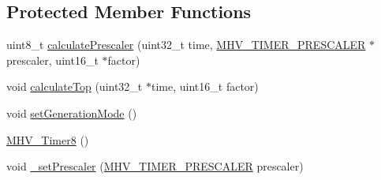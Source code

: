 \subsection*{\-Protected \-Member \-Functions}
\begin{DoxyCompactItemize}
\item 
uint8\-\_\-t \hyperlink{class_m_h_v___timer8_a044d91ee04cc07dad098be8010f94463}{calculate\-Prescaler} (uint32\-\_\-t time, \hyperlink{_m_h_v___timer8_8h_a2e7ef9dbc200586bf55b0003896de599}{\-M\-H\-V\-\_\-\-T\-I\-M\-E\-R\-\_\-\-P\-R\-E\-S\-C\-A\-L\-E\-R} $\ast$prescaler, uint16\-\_\-t $\ast$factor)
\item 
void \hyperlink{class_m_h_v___timer8_a8f1a062c5b11ccc6d644576d127ca4ca}{calculate\-Top} (uint32\-\_\-t $\ast$time, uint16\-\_\-t factor)
\item 
void \hyperlink{class_m_h_v___timer8_a5f8f53c9fc73fed26424c6a6904fdfe6}{set\-Generation\-Mode} ()
\item 
\hyperlink{class_m_h_v___timer8_a2df9d6ab1036772eeea2037f6ad68ab0}{\-M\-H\-V\-\_\-\-Timer8} ()
\item 
void \hyperlink{class_m_h_v___timer8_a45bec0afb3006126f53066365a8558f6}{\-\_\-set\-Prescaler} (\hyperlink{_m_h_v___timer8_8h_a2e7ef9dbc200586bf55b0003896de599}{\-M\-H\-V\-\_\-\-T\-I\-M\-E\-R\-\_\-\-P\-R\-E\-S\-C\-A\-L\-E\-R} prescaler)
\end{DoxyCompactItemize}
